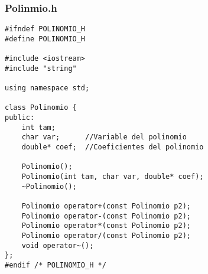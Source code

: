 \documentclass[11pt]{article}
\begin{document}
\subsubsection*{Polinmio.h}
\begin{lstlisting}
#ifndef POLINOMIO_H
#define POLINOMIO_H

#include <iostream>
#include "string"

using namespace std;

class Polinomio {
public:
	int tam;	
	char var;      //Variable del polinomio
	double* coef;  //Coeficientes del polinomio		
	
	Polinomio();
	Polinomio(int tam, char var, double* coef);
	~Polinomio();
	
	Polinomio operator+(const Polinomio p2);
	Polinomio operator-(const Polinomio p2);
	Polinomio operator*(const Polinomio p2);
	Polinomio operator/(const Polinomio p2);
	void operator~();
};
#endif /* POLINOMIO_H */
\end{lstlisting}
\vspace{2 em}
\end{document}
